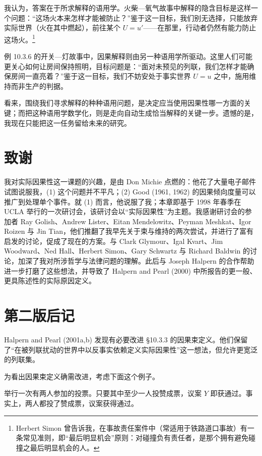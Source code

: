 我认为，答案在于所求解释的语用学。火柴—氧气故事中解释的隐含目标是这样一个问题：“这场火本来怎样才能被防止？”鉴于这一目标，我们别无选择，只能放弃实际世界（火在其中燃起），前往某个 $U=u'$——在那里，行动者仍然有能力防止这场火。\footnote{Herbert Simon 曾告诉我，在事故责任案件中（常适用于铁路道口事故）有一条常见准则，即“最后明显机会”原则：对碰撞负有责任者，是那个拥有避免碰撞之最后明显机会的人。}

例 10.3.6 的开关—灯故事中，因果解释则由另一种语用学所驱动。这里人们可能更关心如何让房间保持照明，目标问题是：“面对未预见的列联，我们怎样才能确保房间一直亮着？”鉴于这一目标，我们不妨安处于事实世界 $U=u$ 之中，施用维持而非生产的判据。

看来，围绕我们寻求解释的种种语用问题，是决定应当使用因果性哪一方面的关键；而把这种语用学数学化，则是走向自动生成恰当解释的关键一步。遗憾的是，我现在只能把这一任务留给未来的研究。

\section*{致谢}

我对实际因果性这一课题的兴趣，是由 Don Michie 点燃的：他花了大量电子邮件试图说服我，(1) 这个问题并不平凡；(2) Good (1961, 1962) 的因果倾向度量可以推广到处理单个事件。就 (1) 而言，他说服了我；本章即基于 1998 年春季在 UCLA 举行的一次研讨会，该研讨会以“实际因果性”为主题。我感谢研讨会的参加者 Ray Golish、Andrew Lister、Eitan Mendelowitz、Peyman Meshkat、Igor Roizen 与 Jin Tian，他们推翻了我早先关于束与维持的两次尝试，并进行了富有启发的讨论，促成了现在的方案。与 Clark Glymour、Igal Kvart、Jim Woodward、Ned Hall、Herbert Simon、Gary Schwartz 与 Richard Baldwin 的讨论，加深了我对所涉哲学与法律问题的理解。此后与 Joseph Halpern 的合作帮助进一步打磨了这些想法，并导致了 Halpern and Pearl (2000) 中所报告的更一般、更具陈述性的实际原因定义。

\section*{第二版后记}

Halpern and Pearl (2001a,b) 发现有必要改进 \S 10.3.3 的因果束定义。他们保留了“在被列联扰动的世界中以反事实依赖定义实际因果性”这一想法，但允许更宽泛的列联集。

为看出因果束定义确需改进，考虑下面这个例子。

\begin{example}
举行一次有两人参加的投票。只要其中至少一人投赞成票，议案 $Y$ 即获通过。事实上，两人都投了赞成票，议案获得通过。
\end{example}

